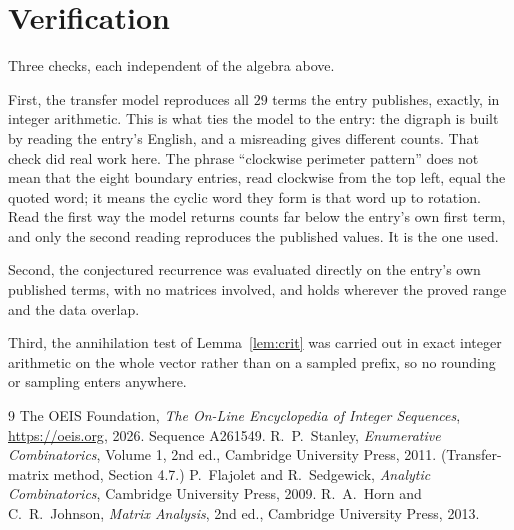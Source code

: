 \documentclass[11pt,a4paper]{article}
\theoremstyle{plain}
\theoremstyle{definition}
\begin{document}
\section{Verification}

Three checks, each independent of the algebra above.

First, the transfer model reproduces all $29$ terms the entry publishes, exactly, in
integer arithmetic. This is what ties the model to the entry: the digraph is built by reading
the entry's English, and a misreading gives different counts. That check did real work here. The phrase ``clockwise perimeter pattern'' does not mean that the eight boundary entries, read clockwise from the top left, equal the quoted word; it means the cyclic word they form is that word up to rotation. Read the first way the model returns counts far below the entry's own first term, and only the second reading reproduces the published values. It is the one used.

Second, the conjectured recurrence was evaluated directly on the entry's own published terms,
with no matrices involved, and holds wherever the proved range and the data overlap.

Third, the annihilation test of Lemma~\ref{lem:crit} was carried out in exact integer
arithmetic on the whole vector rather than on a sampled prefix, so no rounding or sampling
enters anywhere.

\begin{thebibliography}{9}
 The OEIS Foundation, \emph{The On-Line Encyclopedia of Integer
Sequences}, \url{https://oeis.org}, 2026. Sequence A261549.
 R.~P.~Stanley, \emph{Enumerative Combinatorics}, Volume 1, 2nd ed.,
Cambridge University Press, 2011. (Transfer-matrix method, Section 4.7.)
 P.~Flajolet and R.~Sedgewick, \emph{Analytic Combinatorics}, Cambridge
University Press, 2009.
 R.~A.~Horn and C.~R.~Johnson, \emph{Matrix Analysis}, 2nd ed., Cambridge
University Press, 2013.
\end{thebibliography}
\end{document}

